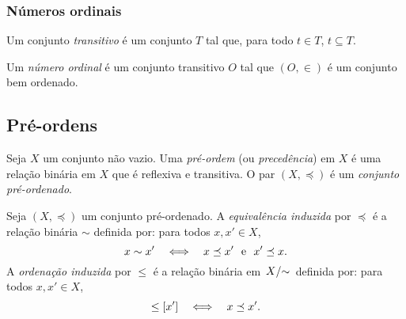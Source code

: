 \subsubsection{Números ordinais}

\begin{definition}
	Um conjunto \emph{transitivo} é um conjunto $T$ tal que, para todo $t \in T$, $t \subseteq T$.
\end{definition}

\begin{definition}
	Um \emph{número ordinal} é um conjunto transitivo $O$ tal que $(O,\in)$ é um conjunto bem ordenado.
\end{definition}






















\subsection{Pré-ordens}

\begin{definition}
Seja $X$ um conjunto não vazio. Uma \emph{pré-ordem} (ou \emph{precedência}) em $X$ é uma relação binária em $X$ que é reflexiva e transitiva. O par $(X,\preceq)$ é um \emph{conjunto pré-ordenado}.
\end{definition}

\begin{definition}
Seja $(X,\preceq)$ um conjunto pré-ordenado. A \emph{equivalência induzida} por $\preceq$ é a relação binária $\sim$ definida por: para todos $x,x' \in X$,
	\begin{equation*}
	x \sim x' \quad \Longleftrightarrow \quad x \preceq x' \text{\ \ e\ \ } x' \preceq x.
	\end{equation*}
A \emph{ordenação induzida} por $\leq$ é a relação binária em $\quo{X}{\sim}$ definida por: para todos $x,x' \in X$,
	\begin{equation*}
	[x] \leq [x'] \sse x \preceq x'.
	\end{equation*}
\end{definition}

